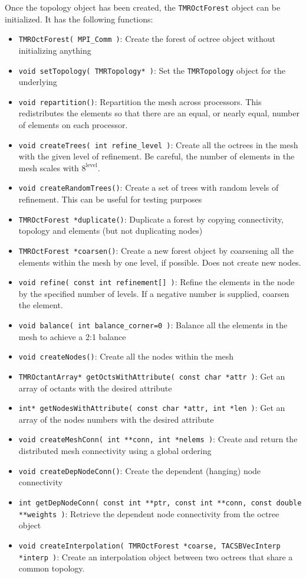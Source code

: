 \documentclass[12pt]{article}
\begin{document}
Once the topology object has been created, the \texttt{TMROctForest} object can be initialized. It has the following functions:
%
\begin{itemize}
\item \texttt{TMROctForest( MPI\_Comm )}: Create the forest of octree object without initializing anything
\item \texttt{void setTopology( TMRTopology* )}: Set the \texttt{TMRTopology} object for the underlying
\item \texttt{void repartition()}: Repartition the mesh across processors. This redistributes the elements so that there are an equal, or nearly equal, number of elements on each processor.
\item \texttt{void createTrees( int refine\_level )}: Create all the octrees in the mesh with the given level of refinement. Be careful, the number of elements in the mesh scales with $8^{\text{level}}$.
\item \texttt{void createRandomTrees()}: Create a set of trees with random levels of refinement. This can be useful for testing purposes
\item \texttt{TMROctForest *duplicate()}: Duplicate a forest by copying connectivity, topology and elements (but not duplicating nodes)
\item \texttt{TMROctForest *coarsen()}: Create a new forest object by coarsening all the elements within the mesh by one level, if possible. Does not create new nodes.
\item \texttt{void refine( const int refinement[] )}: Refine the elements in the node by the specified number of levels. If a negative number is supplied, coarsen the element.
\item \texttt{void balance( int balance\_corner=0 )}: Balance all the elements in the mesh to achieve a 2:1 balance 
\item \texttt{void createNodes()}: Create all the nodes within the mesh
\item \texttt{TMROctantArray* getOctsWithAttribute( const char *attr )}: Get an array of octants with the desired attribute
\item \texttt{int* getNodesWithAttribute( const char *attr, int *len )}: Get an array of the nodes numbers with the desired attribute
\item \texttt{void createMeshConn( int **conn, int *nelems )}: Create and return the distributed mesh connectivity using a global ordering
\item \texttt{void createDepNodeConn()}: Create the dependent (hanging) node connectivity
\item \texttt{int getDepNodeConn( const int **ptr, const int **conn, const double **weights )}: Retrieve the dependent node connectivity from the octree object
\item \texttt{void createInterpolation( TMROctForest *coarse, TACSBVecInterp *interp )}: Create an interpolation object between two octrees that share a common topology.
\end{itemize}
\end{document}
